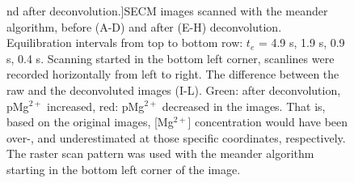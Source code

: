 \begin{figure}[!hp]
nd after deconvolution.]{SECM images scanned with the meander algorithm, before (A-D) and after (E-H) deconvolution.
Equilibration intervals from top to bottom row: $t_e$ = 4.9 s, 1.9 s, 0.9 s, 0.4 s.
Scanning started in the bottom left corner, scanlines were recorded horizontally from left to right.
The difference between the raw and the deconvoluted images (I-L).
Green: after deconvolution, pMg$^{2+}$ increased, red: pMg$^{2+}$ decreased in the images.
That is, based on the original images, [Mg$^{2+}$] concentration would have been over-, and underestimated at those specific coordinates, respectively.
The raster scan pattern was used with the meander algorithm starting in the bottom left corner of the image.}
\label{fig:deconvoluted_meander}
\end{figure}

\begin{figure}[!hp]
\centering

\end{figure}
